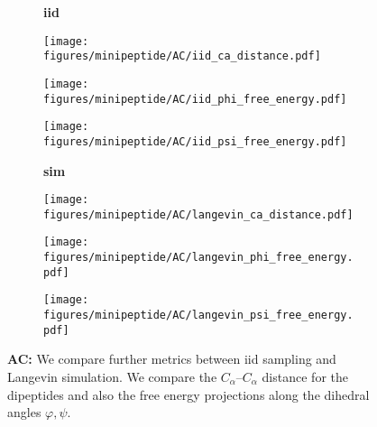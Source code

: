 \begin{figure}
    \centering
    \begin{minipage}{\textwidth}
        \centering
        \begin{subfigure}[c]{0.08\textwidth}
            \textbf{iid}
        \end{subfigure}
        \begin{subfigure}[c]{0.2\textwidth}
            \centering
            \texttt{[image: figures/minipeptide/AC/iid\_ca\_distance.pdf]}            
        \end{subfigure}
        \hspace{0.5cm}
        \begin{subfigure}[c]{0.2\textwidth}
            \centering
            \texttt{[image: figures/minipeptide/AC/iid\_phi\_free\_energy.pdf]}
        \end{subfigure}
        \hspace{0.5cm}
        \begin{subfigure}[c]{0.2\textwidth}
            \centering
            \texttt{[image: figures/minipeptide/AC/iid\_psi\_free\_energy.pdf]}
        \end{subfigure}
    \end{minipage}
    \vspace{0.5cm}
    \begin{minipage}{\textwidth}
        \centering
        \begin{subfigure}[c]{0.08\textwidth}
            \vspace{-0.5cm}
            \textbf{sim}
        \end{subfigure}
        \begin{subfigure}[c]{0.2\textwidth}
            \centering
            \texttt{[image: figures/minipeptide/AC/langevin\_ca\_distance.pdf]}
        \end{subfigure}
        \hspace{0.5cm}
        \begin{subfigure}[c]{0.2\textwidth}
            \centering
            \texttt{[image: figures/minipeptide/AC/langevin\_phi\_free\_energy.pdf]}
        \end{subfigure}
        \hspace{0.5cm}
        \begin{subfigure}[c]{0.2\textwidth}
            \centering
            \texttt{[image: figures/minipeptide/AC/langevin\_psi\_free\_energy.pdf]}
        \end{subfigure}
    \end{minipage}
    \caption{\textbf{AC:} We compare further metrics between iid sampling and Langevin simulation. We compare the $C_\alpha$--$C_\alpha$ distance for the dipeptides and also the free energy projections along the dihedral angles $\varphi, \psi$.}
    \label{fig:minipeptide-ac-more-metrics}
\end{figure}

